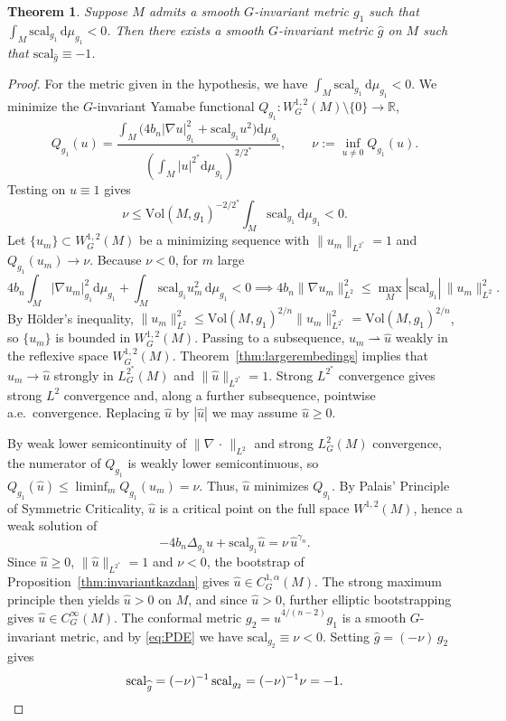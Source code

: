 \documentclass[12pt,a4paper]{amsart}
\theoremstyle{plain}
\newtheorem{theorem}{Theorem}[section]
\theoremstyle{definition}
\theoremstyle{remark}
\newcommand{\ga}{\mathit{g}} %
\begin{document}
\begin{theorem}\label{thm:negativeexistence}
Suppose $M$ admits a smooth $G$-invariant metric $\ga_1$ such that $\int_M\mathrm{scal}_{\ga_1}\,\mathrm{d}\mu_{\ga_1}<0$. Then there exists a smooth $G$-invariant metric $\widehat{\ga}$ on $M$
such that $\mathrm{scal}_{\widehat{\ga}} \equiv -1$.
\end{theorem}
\begin{proof}
For the metric given in the hypothesis, we have
$\int_M\mathrm{scal}_{\ga_1}\,\mathrm{d}\mu_{\ga_1}<0$. We minimize the $G$-invariant Yamabe functional
$Q_{\ga_1} : W^{1,2}_G(M) \setminus \{0\} \to \mathbb{R}$,
\[
Q_{\ga_1}(u) = \frac{\int_M \bigl( 4b_n |\nabla u|_{\ga_1}^2 + \mathrm{scal}_{\ga_1} u^2 \bigr) \mathrm{d}\mu_{\ga_1}}{\left( \int_M |u|^{2^*} \mathrm{d}\mu_{\ga_1} \right)^{2/2^*}},
\qquad \nu := \inf_{u\neq 0} Q_{\ga_1}(u).
\]
Testing on $u\equiv 1$ gives
\[
\nu \le \mathrm{Vol}(M, \ga_1)^{-2/2^*} \int_M \mathrm{scal}_{\ga_1}\,\mathrm{d}\mu_{\ga_1} < 0.
\]
Let $\{u_m\} \subset W^{1,2}_G(M)$ be a minimizing sequence with $\|u_m\|_{L^{2^*}} = 1$ and
$Q_{\ga_1}(u_m) \to \nu$. Because $\nu < 0$, for $m$ large
\[
4b_n \!\int_M\! |\nabla u_m|_{\ga_1}^2 \mathrm{d}\mu_{\ga_1} + \!\int_M\! \mathrm{scal}_{\ga_1} u_m^2 \,\mathrm{d}\mu_{\ga_1} < 0
\implies 4b_n \|\nabla u_m\|_{L^2}^2 \le \max_M |\mathrm{scal}_{\ga_1}|\, \|u_m\|_{L^2}^2.
\]
By Hölder's inequality, $\|u_m\|_{L^2}^2 \le \mathrm{Vol}(M, \ga_1)^{2/n}\|u_m\|_{L^{2^*}}^2 = \mathrm{Vol}(M, \ga_1)^{2/n}$,
so $\{u_m\}$ is bounded in $W^{1,2}_G(M)$. Passing to a subsequence, $u_m \rightharpoonup \widehat{u}$
weakly in the reflexive space $W^{1,2}_G(M)$. Theorem~\ref{thm:largerembedings} implies that $u_m \to \widehat{u}$ strongly in
$L^{2^*}_G(M)$ and $\|\widehat{u}\|_{L^{2^*}} = 1$. Strong $L^{2^*}$ convergence gives strong $L^2$
convergence and, along a further subsequence, pointwise a.e.\ convergence. Replacing $\widehat u$ by
$|\widehat u|$ we may assume $\widehat{u} \ge 0$.

By weak lower semicontinuity of $\|\nabla\,\cdot\,\|_{L^2}$ and strong $L^2_G(M)$ convergence, the
numerator of $Q_{\ga_1}$ is weakly lower semicontinuous, so
$Q_{\ga_1}(\widehat{u}) \le \liminf_{m} Q_{\ga_1}(u_m) = \nu$. Thus, $\widehat{u}$ minimizes
$Q_{\ga_1}$. By Palais' Principle of Symmetric Criticality, $\widehat{u}$ is a critical point on the
full space $W^{1,2}(M)$, hence a weak solution of
\[
-4b_n \Delta_{\ga_1} \widehat{u} + \mathrm{scal}_{\ga_1} \widehat{u} = \nu\, \widehat{u}^{\gamma_n}.
\]
Since $\widehat{u} \ge 0$, $\|\widehat{u}\|_{L^{2^*}} = 1$ and $\nu < 0$, the bootstrap of Proposition~\ref{thm:invariantkazdan} gives $\widehat u\in C^{1,\alpha}_G(M)$. The strong maximum principle then yields $\widehat u>0$ on $M$, and since $\widehat u>0$,
further elliptic bootstrapping gives $\widehat u\in C^\infty_G(M)$. The conformal metric $\ga_2 = \widehat{u}^{4/(n-2)} \ga_1$
is a smooth $G$-invariant metric, and by \eqref{eq:PDE} we have $\mathrm{scal}_{\ga_2} \equiv \nu < 0$.
Setting $\widehat{\ga} = (-\nu)\,\ga_2$ gives
\[
\mathrm{scal}_{\widehat{\ga}} = (-\nu)^{-1}\,\mathrm{scal}_{\ga_2} = (-\nu)^{-1}\nu = -1. \qedhere
\]
\end{proof}
\end{document}
